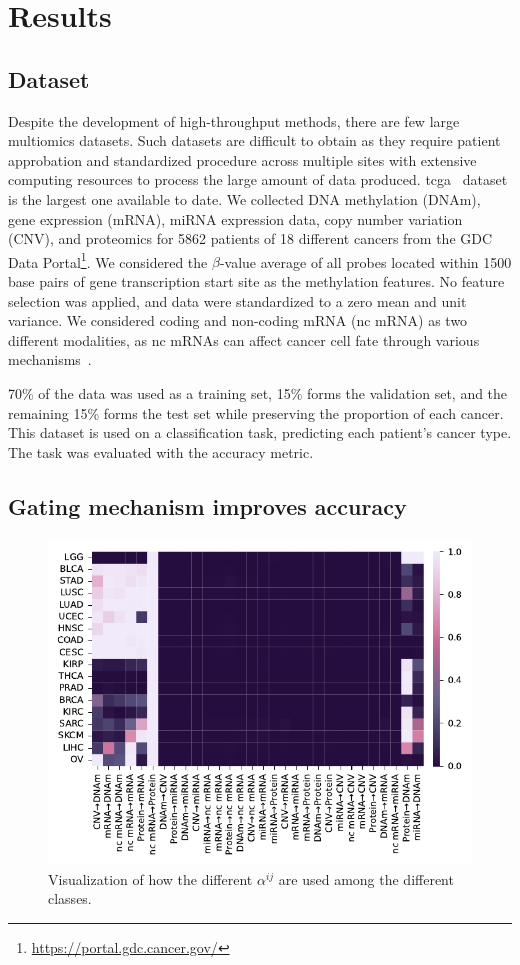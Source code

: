 \documentclass[../main.tex]{subfiles}
\begin{document}
\section{Results}
 \subsection{Dataset}
     Despite the development of high-throughput methods, there are few large multiomics datasets.
     Such datasets are difficult to obtain as they require patient approbation and standardized procedure across multiple sites with extensive computing resources to process the large amount of data produced.
     \Gls{tcga}~\cite{TCGA} dataset is the largest one available to date.
     We collected DNA methylation (DNAm), gene expression (mRNA), miRNA expression data, copy number variation (CNV), and proteomics for 5862 patients of 18 different cancers from the GDC Data Portal\footnote{\url{https://portal.gdc.cancer.gov/}}.
     We considered the \(\beta\)-value average of all probes located within 1500 base pairs of gene transcription start site as the methylation features.
     No feature selection was applied, and data were standardized to a zero mean and unit variance.
     We considered coding and non-coding mRNA (nc mRNA) as two different modalities, as nc mRNAs can affect cancer cell fate through various mechanisms~\cite{Grillone2020}.

     70\% of the data was used as a training set, 15\% forms the validation set, and the remaining 15\% forms the test set while preserving the proportion of each cancer.
     This dataset is used on a classification task, predicting each patient's cancer type.
     The task was evaluated with the accuracy metric.

 \subsection{Gating mechanism improves accuracy}
     \begin{figure}[htbp]
         \centering
         \includegraphics[scale=0.83]{signature_alphas.pdf}
         \caption{Visualization of how the different \(\alpha^{ij}\) are used among the different classes.}
         \label{fig:alphas_signature}
     \end{figure}
\end{document}
